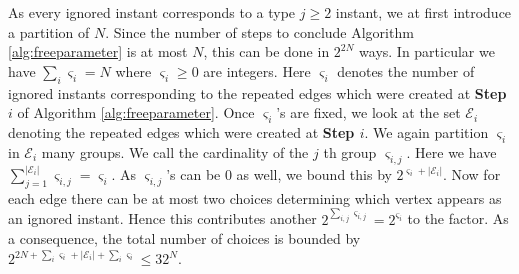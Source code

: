 \documentclass[12pt]{article}
\numberwithin{equation}{section}
\numberwithin{equation}{section}
\theoremstyle{definition}
\renewcommand{\1}{\bf 1}
\begin{document}
As every ignored instant corresponds to a type $j\ge 2$ instant, we at first introduce a partition of $N$. Since the number of steps  to conclude Algorithm \ref{alg:freeparameter} is at most $N$, this can be done in $2^{2N}$ ways. In particular we have $\sum_{i} \varsigma_{i}=N$ where $\varsigma_{i}\ge 0$ are integers. Here $\varsigma_{i}$ denotes the number of  ignored instants corresponding to the repeated edges which were created at \textbf{Step $i$} of Algorithm \ref{alg:freeparameter}. Once $\varsigma_{i}$'s are fixed, we look at the set $\mathcal{E}_{i}$ denoting the repeated edges which were created at \textbf{Step $i$}. We again partition $\varsigma_{i}$ in $\mathcal{E}_{i}$ many groups. We call the cardinality of the $j$ th group $\varsigma_{i,j}$. Here we have $\sum_{j=1}^{|\mathcal{E}_{i}|} \varsigma_{i,j}=\varsigma_{i}$. As $\varsigma_{i,j}$'s can be $0$ as well, we bound this by $2^{\varsigma_{i}+ |\mathcal{E}_{i}|}$. Now for each edge there can be at most two choices determining which vertex appears as an ignored instant. Hence this contributes another $2^{\sum_{i,j} \varsigma_{i,j}}=2^{\varsigma_{i}}$ to the factor. As a consequence, the total number of choices is bounded by $2^{2N + \sum_{i} \varsigma_{i}+ |\mathcal{E}_{i}|+ \sum_{i}\varsigma_{i}}\le 32^{N}$.

%
\end{document}
